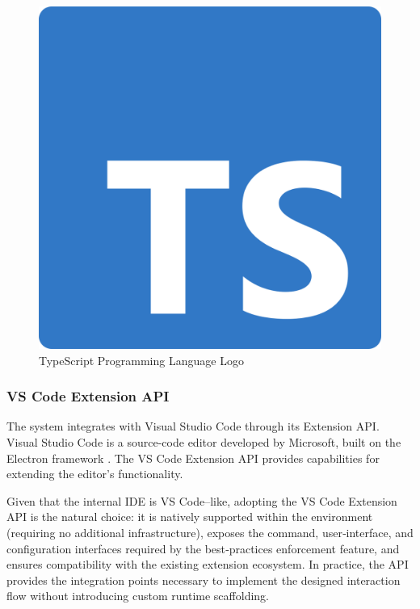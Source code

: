 \begin{spacing}{1.2}
\begin{figure}[H]
    \centering
    \includegraphics[scale=0.05]{Images/Typescript.png}
    \caption{TypeScript Programming Language Logo}
    \label{fig:typescript_logo}
\end{figure}


\subsubsection{VS Code Extension API}
The system integrates with Visual Studio Code through its Extension API. Visual Studio Code is a source-code editor developed by Microsoft, built on the Electron framework \cite{castor2016visual}. The VS Code Extension API provides capabilities for extending the editor's functionality.

Given that the internal IDE is VS Code–like, adopting the VS Code Extension API is the natural choice: it is natively supported within the environment (requiring no additional infrastructure), exposes the command, user‑interface, and configuration interfaces required by the best‑practices enforcement feature, and ensures compatibility with the existing extension ecosystem. In practice, the API provides the integration points necessary to implement the designed interaction flow without introducing custom runtime scaffolding.



\end{spacing}
